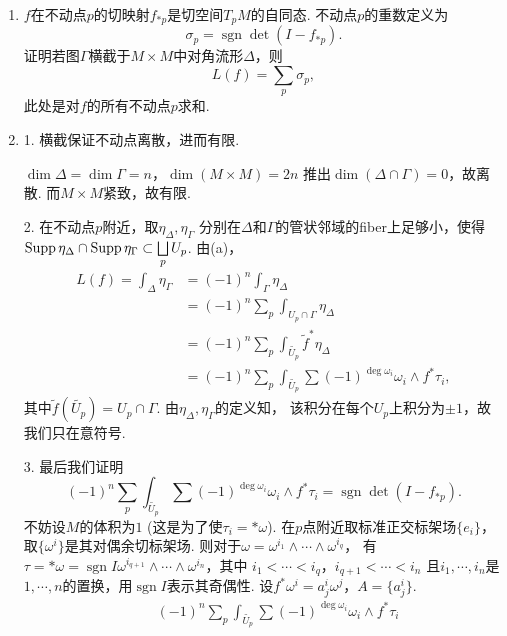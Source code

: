 \begin{itemize}
\begin{enumerate}
        \item[(c)] $f$在不动点$p$的切映射$f_{*p}$是切空间$T_pM$的自同态. 
        不动点$p$的重数定义为
            $$\sigma_p=\operatorname{sgn}\det (I-f_{*p}).$$
        证明若图$\Gamma$横截于$M\times M$中对角流形$\Delta$，则
        \[L(f)=\sum_{p} \sigma_p,\]
        此处是对$f$的所有不动点$p$求和.

        \item[\textbf{证明}] 
        1. 横截保证不动点离散，进而有限.\par
        \qquad $\dim \Delta=\dim \Gamma=n$，$\dim(M\times M)=2n$
        推出$\dim (\Delta\cap \Gamma)=0$，故离散. 而$M\times M$紧致，故有限.\par
        2. 在不动点$p$附近，取$\eta_\Delta,\eta_\Gamma$
        分别在$\Delta$和$\Gamma$的管状邻域的fiber上足够小，使得
        $\operatorname{Supp}\eta_\Delta \cap \operatorname{Supp}\eta_\Gamma \subset \bigsqcup\limits_{p} U_p$. 
        由(a)，
                \begin{align*}
                    L(f)=\int_\Delta \eta_\Gamma&=(-1)^n \int_\Gamma \eta_\Delta\\
                    &=(-1)^n \sum\limits_p \int_{U_p\cap \Gamma} \eta_\Delta\\
                    &=(-1)^n \sum\limits_p \int_{\tilde{U_p}} \tilde{f}^*\eta_\Delta\\
                    &=(-1)^n \sum\limits_p \int_{\tilde{U_p}} \sum (-1)^{\deg \omega_i} \omega_i\wedge f^*\tau_i,
                \end{align*}
            其中$\tilde{f}(\tilde{U_p})=U_p\cap \Gamma$. 
            由$\eta_\Delta,\eta_\Gamma$的定义知，
            该积分在每个$U_p$上积分为$\pm 1$，故我们只在意符号.\par
            3. 最后我们证明 \[(-1)^n \sum_p \int_{\tilde{U_p}} \sum (-1)^{\deg \omega_i} \omega_i\wedge f^*\tau_i
            =\operatorname{sgn}\det (I-f_{*p}).\]
            \qquad 不妨设$M$的体积为$1$ (这是为了使$\tau_i=*\omega$). 
            在$p$点附近取标准正交标架场$\{e_i\}$，
            取$\{\omega^i\}$是其对偶余切标架场. 
            则对于$\omega=\omega^{i_1}\wedge \cdots\wedge \omega^{i_q}$，
            有$\tau=*\omega=\operatorname{sgn}I \omega^{i_{q+1}}\wedge \cdots \wedge \omega^{i_n}$，其中
            $i_1<\cdots<i_q$，$i_{q+1}<\cdots<i_n$
            且$i_1,\cdots,i_n$是$1,\cdots,n$的置换，用$\operatorname{sgn}I$表示其奇偶性. 
            设$f^*\omega^i=a_j^i \omega^j$，$A=\{a^i_j\}$.
                \begin{align*}
                    &\quad\ (-1)^n \sum\limits_p \int_{\tilde{U_p}} \sum (-1)^{\deg \omega_i} \omega_i\wedge f^*\tau_i\\

\end{align*}
\end{enumerate}
\end{itemize}
